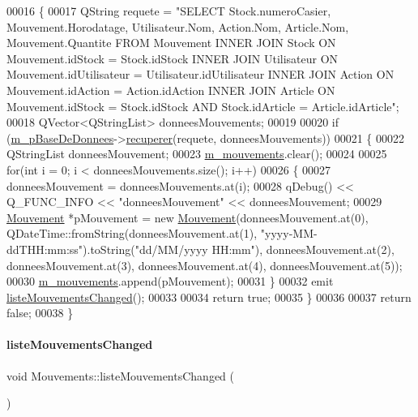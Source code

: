\begin{DoxyCode}
00016 \{
00017     QString requete = \textcolor{stringliteral}{"SELECT Stock.numeroCasier, Mouvement.Horodatage, Utilisateur.Nom, Action.Nom,
       Article.Nom, Mouvement.Quantite FROM Mouvement INNER JOIN Stock ON Mouvement.idStock = Stock.idStock INNER JOIN
       Utilisateur ON Mouvement.idUtilisateur = Utilisateur.idUtilisateur INNER JOIN Action ON Mouvement.idAction =
       Action.idAction INNER JOIN Article ON Mouvement.idStock = Stock.idStock AND Stock.idArticle =
       Article.idArticle"};
00018     QVector<QStringList> donneesMouvements;
00019 
00020     \textcolor{keywordflow}{if} (\hyperlink{class_mouvements_a8cb8047917f2e94adf9798c40b618d31}{m\_pBaseDeDonnees}->\hyperlink{class_base_de_donnees_a77539baad389f5acf754cd2cd452403e}{recuperer}(requete, donneesMouvements))
00021     \{
00022         QStringList donneesMouvement;
00023         \hyperlink{class_mouvements_a5de7bbf3118ba8257e270011f2edf152}{m\_mouvements}.clear();
00024 
00025         \textcolor{keywordflow}{for}(\textcolor{keywordtype}{int} i = 0; i < donneesMouvements.size(); i++)
00026         \{
00027             donneesMouvement = donneesMouvements.at(i);
00028             qDebug() << Q\_FUNC\_INFO << \textcolor{stringliteral}{"donneesMouvement"} << donneesMouvement;
00029             \hyperlink{class_mouvement}{Mouvement} *pMouvement = \textcolor{keyword}{new} \hyperlink{class_mouvement}{Mouvement}(donneesMouvement.at(0), 
      QDateTime::fromString(donneesMouvement.at(1), \textcolor{stringliteral}{"yyyy-MM-ddTHH:mm:ss"}).toString(\textcolor{stringliteral}{"dd/MM/yyyy HH:mm"}), donneesMouvement.at(2), 
      donneesMouvement.at(3), donneesMouvement.at(4), donneesMouvement.at(5));
00030             \hyperlink{class_mouvements_a5de7bbf3118ba8257e270011f2edf152}{m\_mouvements}.append(pMouvement);
00031         \}
00032         emit \hyperlink{class_mouvements_af7abb930cc252388d03b74b144b83084}{listeMouvementsChanged}();
00033 
00034         \textcolor{keywordflow}{return} \textcolor{keyword}{true};
00035     \}
00036 
00037     \textcolor{keywordflow}{return} \textcolor{keyword}{false};
00038 \}
\end{DoxyCode}
\mbox{\label{class_mouvements_af7abb930cc252388d03b74b144b83084}} 
\paragraph{\texorpdfstring{liste\+Mouvements\+Changed}{listeMouvementsChanged}}
{\footnotesize\ttfamily void Mouvements\+::liste\+Mouvements\+Changed (\begin{DoxyParamCaption}{ }\end{DoxyParamCaption})\hspace{0.3cm}{\ttfamily [signal]}}



